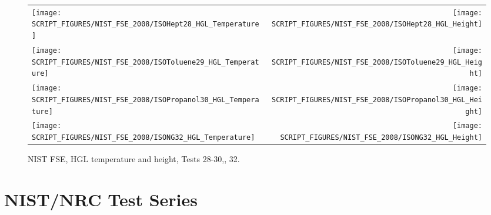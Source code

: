 \begin{figure}[p]
\begin{tabular*}{\textwidth}{l@{\extracolsep{\fill}}r}
\texttt{[image: SCRIPT\_FIGURES/NIST\_FSE\_2008/ISOHept28\_HGL\_Temperature]} &
\texttt{[image: SCRIPT\_FIGURES/NIST\_FSE\_2008/ISOHept28\_HGL\_Height]} \\
\texttt{[image: SCRIPT\_FIGURES/NIST\_FSE\_2008/ISOToluene29\_HGL\_Temperature]} &
\texttt{[image: SCRIPT\_FIGURES/NIST\_FSE\_2008/ISOToluene29\_HGL\_Height]} \\
\texttt{[image: SCRIPT\_FIGURES/NIST\_FSE\_2008/ISOPropanol30\_HGL\_Temperature]} &
\texttt{[image: SCRIPT\_FIGURES/NIST\_FSE\_2008/ISOPropanol30\_HGL\_Height]} \\
\texttt{[image: SCRIPT\_FIGURES/NIST\_FSE\_2008/ISONG32\_HGL\_Temperature]} &
\texttt{[image: SCRIPT\_FIGURES/NIST\_FSE\_2008/ISONG32\_HGL\_Height]}
\end{tabular*}
\caption[NIST FSE, HGL temperature and height, Tests 28-30, 32]
{NIST FSE, HGL temperature and height, Tests 28-30,, 32.}
\label{NIST_FSE_2008_HGL_Temp_6}
\end{figure}


\clearpage

\section{NIST/NRC Test Series}

